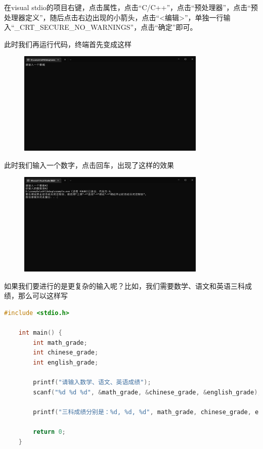 在visual stdio的项目右键，点击属性，点击“C/C++”，点击“预处理器”，点击“预处理器定义”，随后点击右边出现的小箭头，点击“<编辑>”，单独一行输入“\_CRT\_SECURE\_NO\_WARNINGS”，点击“确定”即可。

此时我们再运行代码，终端首先变成这样

\begin{figure}[H]
    \centering
    \includegraphics[width=0.8\textwidth, height=0.3\textheight]{images/1scanf首次.png}
\end{figure}

此时我们输入一个数字，点击回车，出现了这样的效果

\begin{figure}[H]
    \centering
    \includegraphics[width=0.8\textwidth, height=0.3\textheight]{images/1scanf完成.png}
\end{figure}

如果我们要进行的是更复杂的输入呢？比如，我们需要数学、语文和英语三科成绩，那么可以这样写

\begin{lstlisting}[language=C]
    #include <stdio.h>

    int main() {
        int math_grade;
        int chinese_grade;
        int english_grade;

        printf("请输入数学、语文、英语成绩");
        scanf("%d %d %d", &math_grade, &chinese_grade, &english_grade);

        printf("三科成绩分别是：%d, %d, %d", math_grade, chinese_grade, english_grade);
        
        return 0;
    } 
\end{lstlisting}

